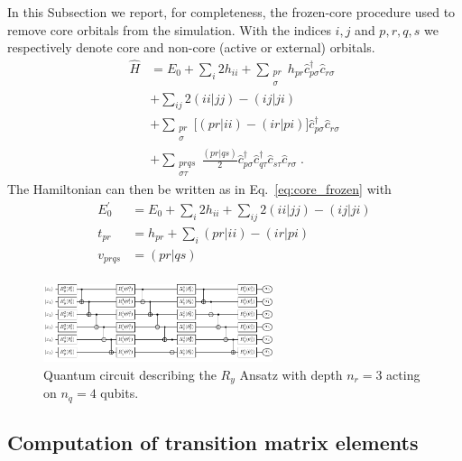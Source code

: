 \documentclass[aps,pra,twocolumn]{revtex4-2}
\newcommand{\crt}[1]{\hat{c}_{#1}^\dagger}
\newcommand{\dst}[1]{\hat{c}_{#1}^{\phantom{\dagger}}}
\begin{document}
In this Subsection we report, for completeness, the frozen-core procedure used to remove core orbitals from the simulation.
With the indices $i,j$ and $p,r,q,s$ we respectively denote core and non-core (active or external) orbitals.
\begin{equation}
\begin{split}
\hat{H} &= E_0 + \sum_i 2 h_{ii} + \sum_{\substack{ pr \\ \sigma}} h_{pr} \crt{p\sigma} \dst{r\sigma} \\
&+ \sum_{ij} 2(ii|jj) - (ij|ji) \\
&+ \sum_{\substack{ pr \\ \sigma}} \Big[ (pr|ii) - (ir|pi) \Big] \crt{p\sigma} \dst{r\sigma} \\
&+ \sum_{\substack{ prqs \\ \sigma\tau}} \frac{(pr|qs)}{2} \crt{p\sigma} \crt{q\tau} \dst{s\tau}  \dst{r\sigma} \;.
\end{split}
\end{equation}
The Hamiltonian can then be written as in Eq.~\eqref{eq:core_frozen} with
\begin{equation}
\begin{split}
E_0^\prime &= E_0 + \sum_i 2 h_{ii} + \sum_{ij} 2(ii|jj) - (ij|ji) \\
t_{pr} &= h_{pr} + \sum_i (pr|ii) - (ir|pi) \\
v_{prqs} &= (pr|qs) \\
\end{split}
\end{equation}

\begin{figure}[t!]
\includegraphics[width=0.6\textwidth]{quantum_circuit/figure-figure0.pdf}
\caption{Quantum circuit describing the $R_y$ Ansatz with depth $n_r=3$ acting on $n_q=4$ qubits.}
\label{fig:ry}
\end{figure}

\subsection{Computation of transition matrix elements}
\label{app:transition}
\end{document}
